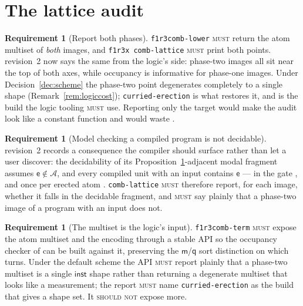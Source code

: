 \documentclass[11pt,a4paper]{article}
\newcommand{\code}[1]{\texttt{#1}}
\newcommand{\MUST}{\textsc{must}}
\newcommand{\SHOULDNOT}{\textsc{should not}}
\newcommand{\mm}{\mathsf{m}}
\newcommand{\ev}{\mathsf{e}}
\newcommand{\qq}{\mathsf{q}}
\newcommand{\Atm}{\mathcal{A}}
\newcommand{\inst}{\mathsf{inst}}
\theoremstyle{definition}
\newtheorem{requirement}[definition]{Requirement}
\theoremstyle{plain}
\begin{document}
\section{The lattice audit}\label{sec:lattice}

\begin{requirement}[Report both phases]\label{req:lattice}
\code{f1r3comb-lower} \MUST{} return the atom multiset of \emph{both} images,
and \code{f1r3x comb-lattice} \MUST{} print both points. \cite{logic} revision~2 now says the same
from the logic's side: phase-two images all sit near the top of both axes,
while occupancy is informative for phase-one images. Under Decision~\ref{dec:scheme} the
phase-two point degenerates completely to a single shape
(Remark~\ref{rem:logiccost}); \code{curried-erection} is what restores it, and
is the build the logic tooling \MUST{} use. Reporting only the target would make the
audit look like a constant function and would waste
\cite[Thm.~6.5]{logic}.
\end{requirement}

\begin{requirement}[Model checking a compiled program is not decidable]
\label{req:mcundec}
\cite{logic} revision~2 records a consequence the compiler should surface
rather than let a user discover: the decidability of its
Proposition~\ref{sec:lattice}-adjacent modal fragment assumes
$\ev \notin \Atm$, and every compiled unit with an input contains $\ev$ ---
in the gate \cite[Lem.~6.2]{draft3}, and once per erected atom
\cite[Rem.~3.11]{draft3}. \code{comb-lattice} \MUST{} therefore report, for
each image, whether it falls in the decidable fragment, and \MUST{} say
plainly that a phase-two image of a program with an input does not.
\end{requirement}

\begin{requirement}[The multiset is the logic's input]\label{req:logicinput}
\code{f1r3comb-term} \MUST{} expose the atom multiset and the encoding through
a stable API so the occupancy checker of \cite[\S6]{logic} can be built
against it, preserving the $\mm$/$\qq$ sort distinction on which
\cite[Rem.~2.5]{logic} turns. Under the default scheme the API \MUST{} report
plainly that a phase-two multiset is a single $\inst$ shape rather than
returning a degenerate multiset that looks like a measurement; the report
\MUST{} name \code{curried-erection} as the build that gives a shape set. It
\SHOULDNOT{} expose more.
\end{requirement}
\end{document}
